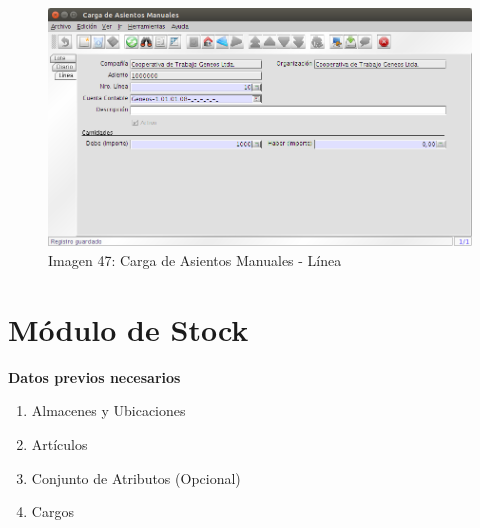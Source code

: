 \documentclass[letterpaper,10pt,spanish]{sphinxmanual}
\begin{document}
\begin{figure}[htbp]
\centering
\capstart

\includegraphics{ly_contabilidad_47.png}
\caption{Imagen 47: Carga de Asientos Manuales - Línea}\end{figure}


\chapter{Módulo de Stock}
\label{stock:modulo-de-stock}\label{stock::doc}
\textbf{Datos previos necesarios}
\begin{enumerate}
\item {} 
Almacenes y Ubicaciones

\item {} 
Artículos

\item {} 
Conjunto de Atributos (Opcional)

\item {} 
Cargos

\end{enumerate}
\end{document}
